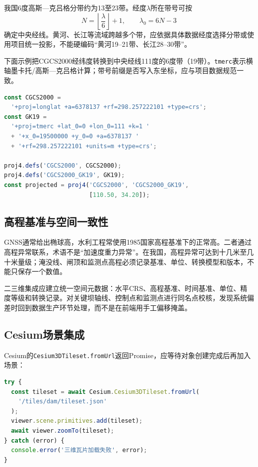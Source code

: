 我国6度高斯—克吕格分带约为13至23带。经度$\lambda$所在带号可按
\[
  N=\left\lfloor\frac{\lambda}{6}\right\rfloor+1,
  \qquad \lambda_0=6N-3
\]
确定中央经线。黄河、长江等流域跨越多个带，应依据具体数据经度选择分带或使用项目统一投影，不能硬编码“黄河19–21带、长江28–30带”。

下面示例把CGCS2000经纬度转换到中央经线111度的6度带（19带）。\texttt{tmerc}表示横轴墨卡托/高斯—克吕格计算；带号前缀是否写入东坐标，应与项目数据规范一致。

\begin{lstlisting}[language=JavaScript]
const CGCS2000 =
  '+proj=longlat +a=6378137 +rf=298.257222101 +type=crs';
const GK19 =
  '+proj=tmerc +lat_0=0 +lon_0=111 +k=1 '
  + '+x_0=19500000 +y_0=0 +a=6378137 '
  + '+rf=298.257222101 +units=m +type=crs';

proj4.defs('CGCS2000', CGCS2000);
proj4.defs('CGCS2000_GK19', GK19);
const projected = proj4('CGCS2000', 'CGCS2000_GK19',
                        [110.50, 34.20]);
\end{lstlisting}

\subsection{高程基准与空间一致性}

GNSS通常给出椭球高，水利工程常使用1985国家高程基准下的正常高。二者通过高程异常联系，术语不是“加速度重力异常”。在我国，高程异常可达到十几米至几十米量级；淹没线、闸顶和监测点高程必须记录基准、单位、转换模型和版本，不能只保存一个数值。

二三维集成应建立统一空间元数据：水平CRS、高程基准、时间基准、单位、精度等级和转换记录。对关键坝轴线、控制点和监测点进行同名点校核，发现系统偏差时回到数据生产环节处理，而不是在前端用手工偏移掩盖。

\subsection{Cesium场景集成}

Cesium的\texttt{Cesium3DTileset.fromUrl}返回Promise，应等待对象创建完成后再加入场景\cite{cesium3DTileset}：

\begin{lstlisting}[language=JavaScript]
try {
  const tileset = await Cesium.Cesium3DTileset.fromUrl(
    '/tiles/dam/tileset.json'
  );
  viewer.scene.primitives.add(tileset);
  await viewer.zoomTo(tileset);
} catch (error) {
  console.error('三维瓦片加载失败', error);
}
\end{lstlisting}

